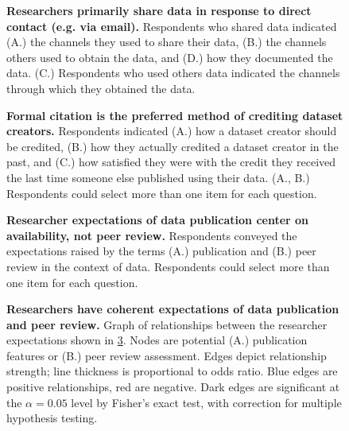 \documentclass[10pt]{article}
\begin{document}
\begin{figure}[!ht]
\begin{center}
\end{center}
\caption{
{\bf Researchers primarily share data in response to direct contact (e.g. via email).}
Respondents who shared data indicated (A.) the channels they used to share their data, (B.) the channels others used to obtain the data, and (D.) how they documented the data.
(C.) Respondents who used others data indicated the channels through which they obtained the data.
}
\label{fig:sharing}
\end{figure}


\begin{figure}[!ht]
\begin{center}
\end{center}
\caption{
{\bf Formal citation is the preferred method of crediting dataset creators.}
Respondents indicated (A.) how a dataset creator should be credited, (B.) how they actually credited a dataset creator in the past, and (C.) how satisfied they were with the credit they received the last time someone else published using their data.  (A., B.) Respondents could select more than one item for each question.
} 
\label{fig:credit}
\end{figure}


\begin{figure}[!ht]
\begin{center}
\end{center}
\caption{
{\bf Researcher expectations of data publication center on availability, not peer review.}
Respondents conveyed the expectations raised by the terms (A.) publication and (B.) peer review in the context of data. Respondents could select more than one item for each question.
}
\label{fig:definitions}
\end{figure}


\begin{figure}[!ht]
\begin{center}
\end{center}
\caption{
{\bf Researchers have coherent expectations of data publication and peer review.}
Graph of relationships between the researcher expectations shown in \ref{fig:definitions}. 
Nodes are potential (A.) publication features or (B.) peer review assessment.
Edges depict relationship strength; line thickness is proportional to odds ratio. Blue edges are positive relationships, red are negative. Dark edges are significant at the $\alpha=0.05$ level by Fisher's exact test, with correction for multiple hypothesis testing.
}
\label{fig:definition_web}
\end{figure}
\end{document}
